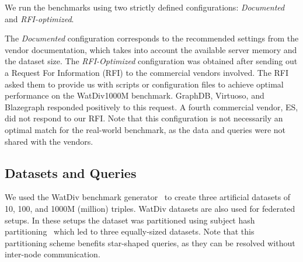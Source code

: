 \documentclass[twocolumn]{bmcart}%
\newcommand\todo[1]{\textcolor{red}{#1}}
\begin{document}
We run the benchmarks using two strictly defined configurations: \emph{Documented} and \emph{RFI-optimized}.  

The \emph{Documented} configuration corresponds to the recommended settings from the vendor
documentation, which takes into account the available server memory and the dataset size.
The \emph{RFI-Optimized} configuration was obtained after sending out a  Request For Information (RFI) to the commercial vendors involved. The RFI asked them to provide us with scripts or configuration files to achieve optimal performance on the WatDiv1000M benchmark. GraphDB, Virtuoso, and Blazegraph responded positively to this request. A fourth commercial vendor, ES, did not respond to our RFI. 
Note that this configuration is not necessarily an optimal match for the real-world benchmark, as the data and queries were not shared with the vendors.


\subsection{Datasets and Queries}
\label{subsec:dataqueries}
%



We used the  WatDiv benchmark generator~\cite{alucc2014diversified} to create three artificial datasets of 10, 100, and 1000M (million) triples. 
WatDiv datasets are also used for federated setups. 
In these setups the dataset was partitioned using subject hash partitioning~\cite{Zeng, Harth} which led to three equally-sized datasets.
Note that this partitioning scheme benefits star-shaped queries, as they can be resolved without inter-node communication.
\end{document}
